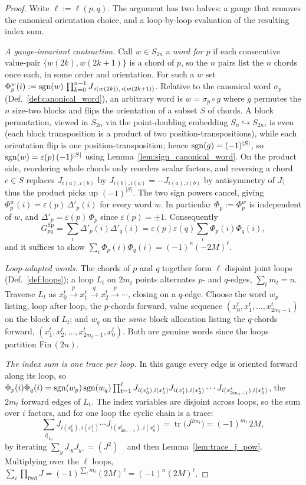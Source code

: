 \begin{proof}
\leanok
Write $\ell := \ell(p,q)$. The argument has two halves: a gauge that
removes the canonical orientation choice, and a loop-by-loop evaluation of
the resulting index sum.

\medskip\noindent\emph{A gauge-invariant contraction.}
Call $w\in S_{2n}$ a \emph{word for $p$} if each consecutive value-pair
$\{w(2k),w(2k+1)\}$ is a chord of $p$, so the $n$ pairs list the $n$ chords
once each, in some order and orientation. For such a $w$ set
$\Phi^w_p(i) := \operatorname{sgn}(w)\,\prod_{k=0}^{n-1} J_{\,i(w(2k)),\,i(w(2k+1))}$.
Relative to the canonical word $\sigma_p$ (Def.~\ref{def:canonical_word}),
an arbitrary word is $w=\sigma_p\circ g$ where $g$ permutes the $n$
size-two blocks and flips the orientation of a subset $S$ of chords. A
block permutation, viewed in $S_{2n}$ via the point-doubling embedding
$S_n\hookrightarrow S_{2n}$, is even (each block transposition is a product
of two position-transpositions), while each orientation flip is one
position-transposition; hence $\operatorname{sgn}(g)=(-1)^{|S|}$, so
$\operatorname{sgn}(w)=\varepsilon(p)\,(-1)^{|S|}$ using
Lemma~\ref{lem:sign_canonical_word}. On the product side, reordering whole
chords only reorders scalar factors, and reversing a chord $c\in S$
replaces $J_{i(a),i(b)}$ by $J_{i(b),i(a)}=-J_{i(a),i(b)}$ by antisymmetry
of $J$; thus the product picks up $(-1)^{|S|}$. The two sign powers cancel,
giving $\Phi^w_p(i)=\varepsilon(p)\,\Delta'_p(i)$ for every word $w$. In
particular $\Phi_p:=\Phi^w_p$ is independent of $w$, and
$\Delta'_p=\varepsilon(p)\,\Phi_p$ since $\varepsilon(p)=\pm1$.
Consequently
\[
  G^{\mathrm{Sp}}_{pq}=\sum_i\Delta'_p(i)\Delta'_q(i)
  =\varepsilon(p)\varepsilon(q)\sum_i\Phi_p(i)\Phi_q(i),
\]
and it suffices to show $\sum_i\Phi_p(i)\Phi_q(i)=(-1)^n(-2M)^{\ell}$.

\medskip\noindent\emph{Loop-adapted words.}
The chords of $p$ and $q$ together form $\ell$ disjoint joint loops
(Def.~\ref{def:loops}); a loop $L_t$ on $2m_t$ points alternates $p$- and
$q$-edges, $\sum_t m_t=n$. Traverse $L_t$ as
$x^t_0\xrightarrow{p}x^t_1\xrightarrow{q}x^t_2\xrightarrow{p}\cdots$,
closing on a $q$-edge. Choose the word $w_p$ listing, loop after loop, the
$p$-chords forward, value sequence $(x^t_0,x^t_1,\dots,x^t_{2m_t-1})$ on
the block of $L_t$; and $w_q$ on the \emph{same} block allocation listing
the $q$-chords forward, $(x^t_1,x^t_2,\dots,x^t_{2m_t-1},x^t_0)$. Both are
genuine words since the loops partition $\mathrm{Fin}\,(2n)$.

\medskip\noindent\emph{The index sum is one trace per loop.}
In this gauge every edge is oriented forward along its loop, so
$\Phi_p(i)\Phi_q(i)=\operatorname{sgn}(w_p)\operatorname{sgn}(w_q)\prod_{t=1}^{\ell}
J_{i(x^t_0),i(x^t_1)}J_{i(x^t_1),i(x^t_2)}\cdots J_{i(x^t_{2m_t-1}),i(x^t_0)}$,
the $2m_t$ forward edges of $L_t$. The index variables are disjoint across
loops, so the sum over $i$ factors, and for one loop the cyclic chain is a
trace:
\[
  \sum_{i|_{L_t}}J_{i(x^t_0),i(x^t_1)}\cdots J_{i(x^t_{2m_t-1}),i(x^t_0)}
  =\operatorname{tr}\!\bigl(J^{2m_t}\bigr)=(-1)^{m_t}\,2M,
\]
by iterating $\sum_{y}J_{\cdot y}J_{y\cdot}=(J^2)_{\cdot\cdot}$ and then
Lemma~\ref{lem:trace_j_pow}. Multiplying over the $\ell$ loops,
$\sum_i\prod_{\text{fwd}}J=(-1)^{\sum_t m_t}(2M)^{\ell}=(-1)^n(2M)^{\ell}$.


\end{proof}
